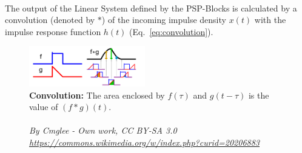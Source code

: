 \\[2em]
The output of the Linear System defined by the PSP-Blocks is calculated by a convolution (denoted by $\ast$) of the
incoming impulse density $x(t)$ with the impulse response function $h(t)$ (Eq.~\ref{eq:convolution}).\\
\begin{figure}
    \centering
    \includegraphics[width=0.45\textwidth]{Figures/convolution/wikipedia-citation-needed}
    \caption{\textbf{Convolution:} The area enclosed by $f(\tau)$ and $g(t-\tau)$ is the value of $(f\ast g)(t)$.\\
    \hrulefill \\
    \textit{By Cmglee - Own work, CC BY-SA 3.0  \url{https://commons.wikimedia.org/w/index.php?curid=20206883}}}
    \label{fig:Convolution}
\end{figure}
